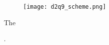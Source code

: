 \documentclass[a4paper,11pt]{article}
\begin{document}
\begin{figure}[h]
    \label{fig:d2q9-scheme}
    \centering
    \texttt{[image: d2q9\_scheme.png]}
\end{figure}





The



.





% 
\end{document}
